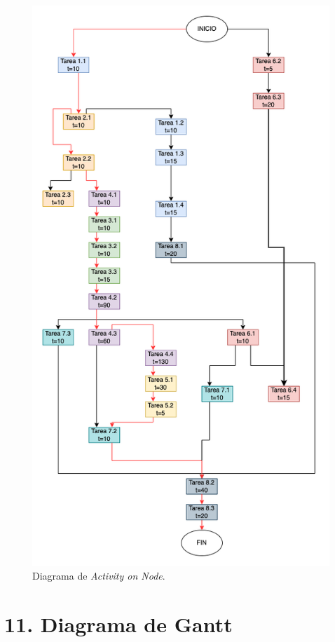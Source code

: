 \documentclass[
11pt, %
]{charter}
\begin{document}
\begin{figure}[H]
\centering 
\includegraphics[width=.75\textwidth]{./Figuras/figura2.png}
\caption{Diagrama de \textit{Activity on Node}.}
\label{fig:AoN}
\end{figure}

\section{11. Diagrama de Gantt}
\label{sec:gantt}
\end{document}
